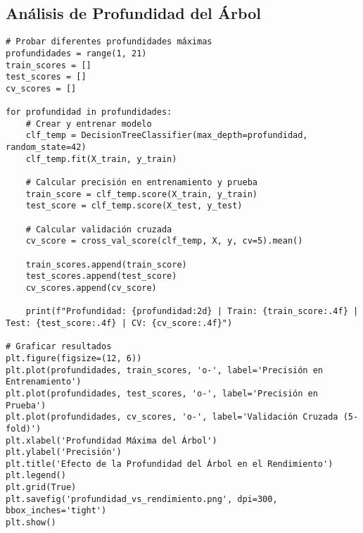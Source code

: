 \documentclass[12pt]{article}
\begin{document}
\subsection{Análisis de Profundidad del Árbol}
\begin{lstlisting}
# Probar diferentes profundidades máximas
profundidades = range(1, 21)
train_scores = []
test_scores = []
cv_scores = []

for profundidad in profundidades:
    # Crear y entrenar modelo
    clf_temp = DecisionTreeClassifier(max_depth=profundidad, random_state=42)
    clf_temp.fit(X_train, y_train)
    
    # Calcular precisión en entrenamiento y prueba
    train_score = clf_temp.score(X_train, y_train)
    test_score = clf_temp.score(X_test, y_test)
    
    # Calcular validación cruzada
    cv_score = cross_val_score(clf_temp, X, y, cv=5).mean()
    
    train_scores.append(train_score)
    test_scores.append(test_score)
    cv_scores.append(cv_score)
    
    print(f"Profundidad: {profundidad:2d} | Train: {train_score:.4f} | Test: {test_score:.4f} | CV: {cv_score:.4f}")

# Graficar resultados
plt.figure(figsize=(12, 6))
plt.plot(profundidades, train_scores, 'o-', label='Precisión en Entrenamiento')
plt.plot(profundidades, test_scores, 'o-', label='Precisión en Prueba')
plt.plot(profundidades, cv_scores, 'o-', label='Validación Cruzada (5-fold)')
plt.xlabel('Profundidad Máxima del Árbol')
plt.ylabel('Precisión')
plt.title('Efecto de la Profundidad del Árbol en el Rendimiento')
plt.legend()
plt.grid(True)
plt.savefig('profundidad_vs_rendimiento.png', dpi=300, bbox_inches='tight')
plt.show()
\end{lstlisting}
\end{document}
